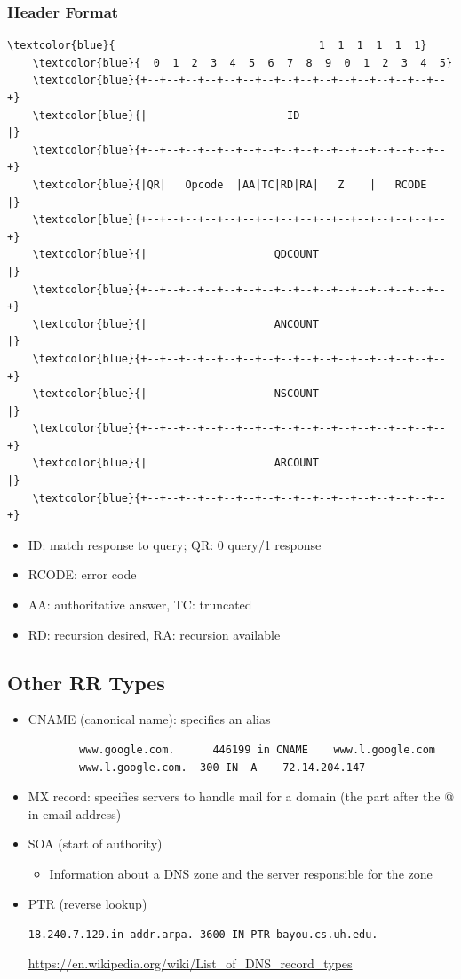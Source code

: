 \subsubsection{Header Format}
\begin{Verbatim}[commandchars=\\\{\}]
    \textcolor{blue}{                                1  1  1  1  1  1}
    \textcolor{blue}{  0  1  2  3  4  5  6  7  8  9  0  1  2  3  4  5}
    \textcolor{blue}{+--+--+--+--+--+--+--+--+--+--+--+--+--+--+--+--+}
    \textcolor{blue}{|                      ID                       |}
    \textcolor{blue}{+--+--+--+--+--+--+--+--+--+--+--+--+--+--+--+--+}
    \textcolor{blue}{|QR|   Opcode  |AA|TC|RD|RA|   Z    |   RCODE   |}
    \textcolor{blue}{+--+--+--+--+--+--+--+--+--+--+--+--+--+--+--+--+}
    \textcolor{blue}{|                    QDCOUNT                    |}
    \textcolor{blue}{+--+--+--+--+--+--+--+--+--+--+--+--+--+--+--+--+}
    \textcolor{blue}{|                    ANCOUNT                    |}
    \textcolor{blue}{+--+--+--+--+--+--+--+--+--+--+--+--+--+--+--+--+}
    \textcolor{blue}{|                    NSCOUNT                    |}
    \textcolor{blue}{+--+--+--+--+--+--+--+--+--+--+--+--+--+--+--+--+}
    \textcolor{blue}{|                    ARCOUNT                    |}
    \textcolor{blue}{+--+--+--+--+--+--+--+--+--+--+--+--+--+--+--+--+}
\end{Verbatim}
\begin{itemize}[nosep]
    \item ID: match response to query; QR: 0 query/1 response
    \item RCODE: error code
    \item AA: authoritative answer, TC: truncated
    \item RD: recursion desired, RA: recursion available
\end{itemize}
\subsection{Other RR Types}
\begin{itemize}[nosep]
    \item CNAME (canonical name): specifies an alias
          \begin{verbatim}
        www.google.com.      446199 in CNAME    www.l.google.com
        www.l.google.com.  300 IN  A    72.14.204.147
    \end{verbatim}
    \item MX record: specifies servers to handle mail for a domain (the part after the @ in email address)
    \item SOA (start of authority)
          \begin{itemize}[nosep]
              \item Information about a DNS zone and the server responsible for the zone
          \end{itemize}
    \item PTR (reverse lookup)

          \verb|18.240.7.129.in-addr.arpa. 3600 IN PTR bayou.cs.uh.edu.|

          \url{https://en.wikipedia.org/wiki/List_of_DNS_record_types}
\end{itemize}

